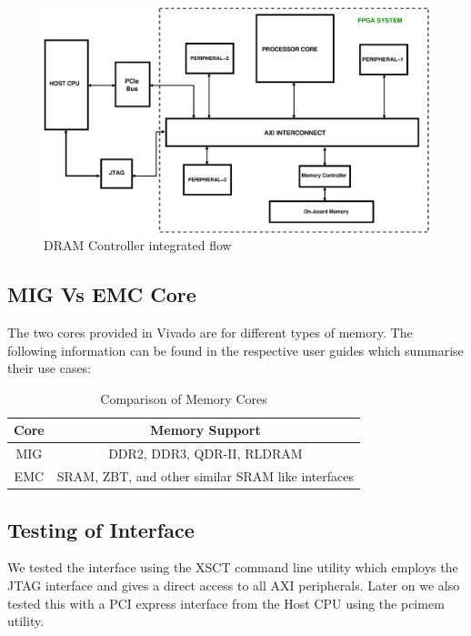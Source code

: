 \begin{figure}[H]
\centering
\includegraphics[width=\textwidth]{eps_pdf_sources/ajit_fpga/DRAM_without_PCIe/DRAM_without_PCIe}
\caption{DRAM Controller integrated flow}
\label{DRAM Controller integrated flow}
\end{figure}

\subsection{MIG Vs EMC Core}

The two cores provided in Vivado are for different types of memory. The following information can be found in the respective user guides
which summarise their use cases:

\begin{table}[H]
\centering
\begin{tabular}{c | c}
\hline
Core & Memory Support \\
\hline
 MIG & DDR2, DDR3, QDR-II, RLDRAM \\
 EMC & SRAM, ZBT, and other similar SRAM like interfaces \\
\end{tabular}
\caption{Comparison of Memory Cores}
\end{table}

\subsection{Testing of Interface}

We tested the interface using the XSCT command line utility which employs the JTAG interface and gives a direct access to all AXI
peripherals. Later on we also tested this with a PCI express interface from the Host CPU using the pcimem utility.

